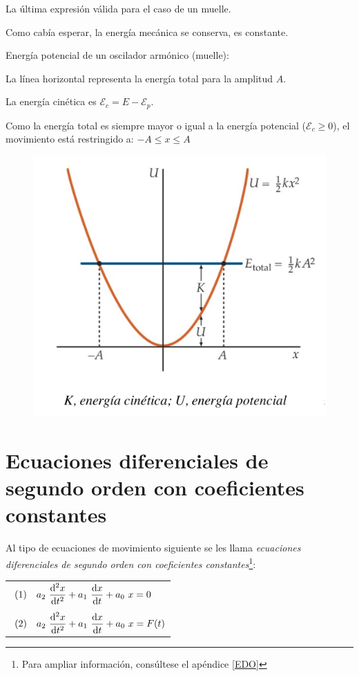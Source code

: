 \small{La última expresión válida para el caso de un muelle\normalsize{.}

Como cabía esperar, la energía mecánica se conserva, es constante.

\vspace{20mm} %
\begin{multicols}{2}
Energía potencial de un oscilador armónico (muelle):

La línea horizontal representa la energía total para la amplitud $A$.

La energía cinética es $\mathcal E_c=E-\mathcal E_p$.

Como la energía total es siempre mayor o igual a la energía potencial ($\mathcal E_c\geq 0$), el movimiento está restringido a: $ -A\leq x \leq A$	
\begin{figure}[H]
		\centering
		\includegraphics[width=.5\textwidth]{imagenes/imagenes19/T19IM05.png}
	\end{figure}
\end{multicols}

\section[Ecuaciones diferenciales de segundo orden con coeficientes constantes]{Ecuaciones diferenciales de segundo orden con coeficientes constantes}

Al tipo de ecuaciones de movimiento siguiente se les llama \emph{ecuaciones diferenciales de segundo orden con coeficientes constantes}\footnote{Para ampliar información, consúltese el apéndice \ref{EDO}}:

\begin{table}[H]
\centering
\begin{tabular}{l}
	$\ (1) \quad \displaystyle a_2 \ \dv[2]{x}{t}+a_1\ \dv{x}{t}+a_0\ x=0$ \\ \\
	$\ (2) \quad \displaystyle a_2 \ \dv[2]{x}{t}+a_1\ \dv{x}{t}+a_0\ x=F(t)$
\end{tabular}
\end{table}

}
